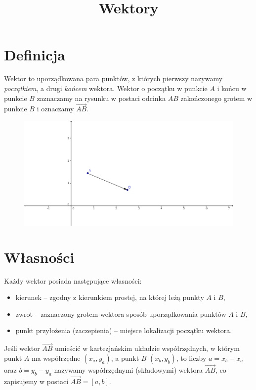 \documentclass [a4paper, 12pt, oneside]{article}
\author{}
\title{Wektory}
\begin{document}
\maketitle
\section*{Definicja}
Wektor to uporządkowana para punktów, z których pierwszy nazywamy \emph{początkiem}, a drugi \emph{końcem} wektora. Wektor o początku w punkcie $A$ i końcu w punkcie $B$ zaznaczamy na rysunku w postaci odcinka $AB$ zakończonego grotem w punkcie $B$ i oznaczamy $\overrightarrow{AB}$.

\begin{figure}[h]
\begin{center}
    \includegraphics[width=15cm]{Graphics/wektor1}
\end{center}
\end{figure}

\section*{Własności}

Każdy wektor posiada następujące własności:
\begin{itemize}
    \item kierunek -- zgodny z kierunkiem prostej, na której leżą punkty $A$ i $B$,
    \item zwrot -- zaznaczony grotem wektora sposób uporządkowania punktów $A$ i $B$,
    \item punkt przyłożenia (zaczepienia) -- miejsce lokalizacji początku wektora.
\end{itemize}

Jeśli wektor $\overrightarrow{AB}$ umieścić w kartezjańskim układzie współrzędnych, w którym punkt $A$ ma współrzędne $(x_a,y_a)$, a punkt $B$ $(x_b,y_b)$, to liczby $a = x_b - x_a$ oraz $b = y_b - y_a$ nazywamy współrzędnymi (składowymi) wektora $\overrightarrow{AB}$, co zapisujemy w postaci $\overrightarrow{AB} = [a,b]$.
\end{document}
